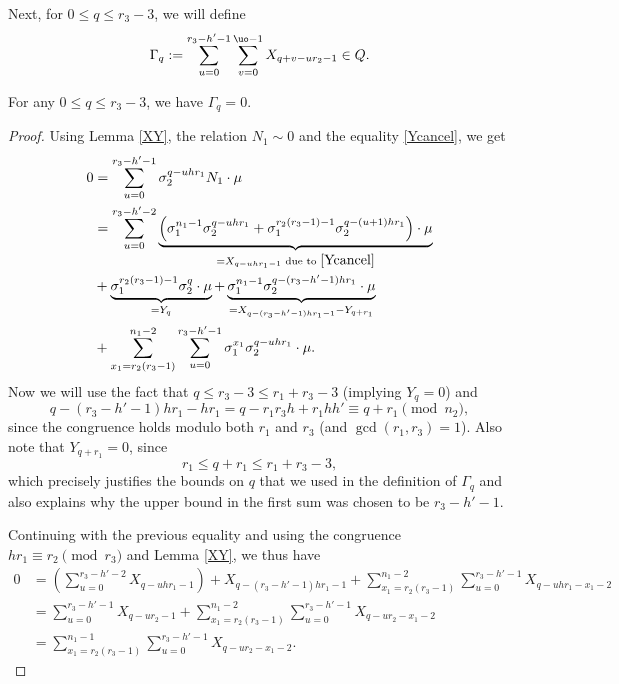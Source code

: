 Next, for $0\leq q \leq r_3-3$, we will define 
\begin{equation}\label{Gamma}
\Gamma_q:=\sum_{u=0}^{r_3-h'-1}\sum_{v=0}^{\uo-1}X_{q+v-ur_2-1}\in Q.
\end{equation}

\begin{lemma}\label{G0}
For any $0\leq q \leq r_3-3$, we have $\Gamma_q=0$.
\end{lemma}
\begin{proof}
Using Lemma \ref{XY}, the relation $N_1\sim 0$ and the equality \eqref{Ycancel}, 
we get
\begin{align*}
0&= \sum_{u=0}^{r_3-h'-1} \sigma_2^{q-uhr_1}N_1\cdot \mu\\
&= \sum_{u=0}^{r_3-h'-2}  \underbrace{\left(\sigma_1^{n_1-1}\sigma_2^{q-uh r_1} +\sigma_1^{r_2(r_3-1)-1}\sigma_2^{q-(u+1)h r_1}\right)\cdot \mu}_{=X_{q-uhr_1-1} \text{ due to } \eqref{Ycancel}}\\
&+\underbrace{\sigma_1^{r_2(r_3-1)-1}\sigma_2^q\cdot \mu}_{=Y_q}+
\underbrace{\sigma_1^{n_1-1}\sigma_2^{q-(r_3-h'-1)h r_1}\cdot\mu}_{=X_{q-(r_3-h'-1)hr_1-1}-Y_{q+r_1}}\\
&+\sum_{x_1=r_2(r_3-1)}^{n_1-2}\sum_{u=0}^{r_3-h'-1} \sigma_1^{x_1}\sigma_2^{q-uh r_1}\cdot \mu.
\end{align*}
Now we will use the fact that $q\leq r_3-3\leq r_1+r_3-3$ (implying $Y_q=0$) and $$q-(r_3-h'-1)h r_1-hr_1=q-r_1r_3h+r_1hh'\equiv q+r_1\pmod{n_2},$$ since the congruence holds modulo both $r_1$ and $r_3$ (and $\gcd(r_1,r_3)=1$). Also note that $Y_{q+r_1}=0$, since
$$r_1\leq q+r_1\leq r_1+r_3-3,$$
which precisely justifies the bounds on $q$ that we used in the definition of $\Gamma_q$ and also explains why the upper bound in the first sum was chosen to be $r_3-h'-1$.

Continuing with the previous equality and using the congruence $hr_1\equiv r_2\pmod{r_3}$ and Lemma \ref{XY}, we thus have
\begin{align*}
0&= \left(\sum_{u=0}^{r_3-h'-2} X_{q-uhr_1-1}\right)+X_{q-(r_3-h'-1)hr_1-1}+\sum_{x_1=r_2(r_3-1)}^{n_1-2}\sum_{u=0}^{r_3-h'-1} X_{q-uh r_1-x_1-2}\\
&=\sum_{u=0}^{r_3-h'-1} X_{q-ur_2-1}+\sum_{x_1=r_2(r_3-1)}^{n_1-2}\sum_{u=0}^{r_3-h'-1} X_{q-ur_2-x_1-2}\\
&=\sum_{x_1=r_2(r_3-1)}^{n_1-1}\sum_{u=0}^{r_3-h'-1} X_{q-ur_2-x_1-2}.
\end{align*}


\end{proof}
